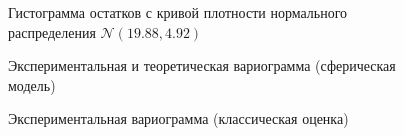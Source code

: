 \begin{figure}[H]
\caption{Гистограмма остатков с кривой плотности нормального распределения $\mathcal{N}(19.88, 4.92)$}
\label{img:resid_hist}
\end{figure}

\begin{figure}[H]
\caption{Экспериментальная и теоретическая вариограмма (сферическая модель)}
\label{img:manual-mod}
\end{figure}

\begin{figure}[H]
\caption{Экспериментальная вариограмма (классическая оценка)}
\label{img:classical_emp}
\end{figure}

